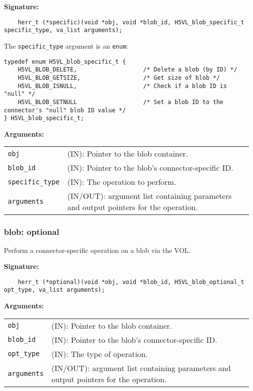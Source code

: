 \begin{mdframed}[style=bgbox]
\textbf{Signature:}
\begin{lstlisting}
    herr_t (*specific)(void *obj, void *blob_id, H5VL_blob_specific_t specific_type, va_list arguments);
\end{lstlisting}

The \texttt{specific\_type} argument is an \texttt{enum}:
\begin{lstlisting}
typedef enum H5VL_blob_specific_t {
    H5VL_BLOB_DELETE,                   /* Delete a blob (by ID) */
    H5VL_BLOB_GETSIZE,                  /* Get size of blob */
    H5VL_BLOB_ISNULL,                   /* Check if a blob ID is "null" */ 
    H5VL_BLOB_SETNULL                   /* Set a blob ID to the connector's "null" blob ID value */
} H5VL_blob_specific_t;
\end{lstlisting}

\textbf{Arguments:}\\
\begin{tabular}{l p{13.5cm}}
  \texttt{obj} & (IN): Pointer to the blob container.\\
  \texttt{blob\_id} & (IN): Pointer to the blob's connector-specific ID.\\
  \texttt{specific\_type} & (IN): The operation to perform.\\
  \texttt{arguments} & (IN/OUT): argument list containing parameters and output pointers for the operation. \\
\end{tabular}
\end{mdframed}

\subsubsection{blob: optional}
Perform a connector-specific operation on a blob via the VOL.

\begin{mdframed}[style=bgbox]
\textbf{Signature:}
\begin{lstlisting}
    herr_t (*optional)(void *obj, void *blob_id, H5VL_blob_optional_t opt_type, va_list arguments);             
\end{lstlisting}

\textbf{Arguments:}\\
\begin{tabular}{l p{13.5cm}}
  \texttt{obj} & (IN): Pointer to the blob container.\\
  \texttt{blob\_id} & (IN): Pointer to the blob's connector-specific ID.\\
  \texttt{opt\_type} & (IN): The type of operation.\\
  \texttt{arguments} & (IN/OUT): argument list containing parameters and output pointers for the operation. \\
\end{tabular}
\end{mdframed}

